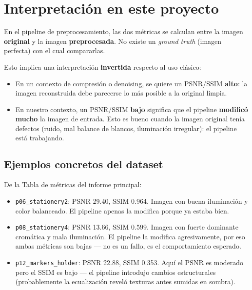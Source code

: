 \documentclass[11pt,a4paper]{article}
\begin{document}
\section{Interpretación en este proyecto}

En el pipeline de preprocesamiento, las dos métricas se calculan entre la
imagen \textbf{original} y la imagen \textbf{preprocesada}. No existe un
\emph{ground truth} (imagen perfecta) con el cual compararlas.

Esto implica una interpretación \textbf{invertida} respecto al uso clásico:

\begin{itemize}
    \item En un contexto de compresión o denoising, se quiere un PSNR/SSIM
          \textbf{alto}: la imagen reconstruida debe parecerse lo más posible
          a la original limpia.
    \item En nuestro contexto, un PSNR/SSIM \textbf{bajo} significa que el
          pipeline \textbf{modificó mucho} la imagen de entrada. Esto es bueno
          cuando la imagen original tenía defectos (ruido, mal balance de blancos,
          iluminación irregular): el pipeline está trabajando.
\end{itemize}

\subsection{Ejemplos concretos del dataset}

De la Tabla de métricas del informe principal:

\begin{itemize}
    \item \texttt{p06\_stationery2}: PSNR 29.40, SSIM 0.964. Imagen con buena
          iluminación y color balanceado. El pipeline apenas la modifica porque
          ya estaba bien.
    \item \texttt{p08\_stationery4}: PSNR 13.66, SSIM 0.599. Imagen con fuerte
          dominante cromática y mala iluminación. El pipeline la modifica
          agresivamente, por eso ambas métricas son bajas — no es un fallo,
          es el comportamiento esperado.
    \item \texttt{p12\_markers\_holder}: PSNR 22.88, SSIM 0.353. Aquí el PSNR
          es moderado pero el SSIM es bajo — el pipeline introdujo cambios
          estructurales (probablemente la ecualización reveló texturas antes
          sumidas en sombra).
\end{itemize}
\end{document}
